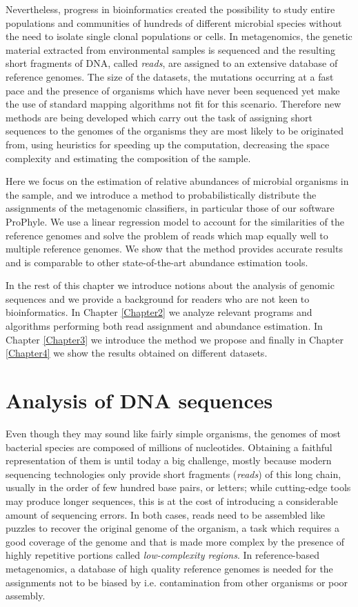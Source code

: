 Nevertheless, progress in bioinformatics created the possibility to study entire populations and communities of hundreds of different microbial species without the need to isolate single clonal populations or cells. In metagenomics, the genetic material extracted from environmental samples is sequenced and the resulting short fragments of DNA, called \textit{reads}, are assigned to an extensive database of reference genomes. The size of the datasets, the mutations occurring at a fast pace and the presence of organisms which have never been sequenced yet make the use of standard mapping algorithms not fit for this scenario. Therefore new methods are being developed which carry out the task of assigning short sequences to the genomes of the organisms they are most likely to be originated from, using heuristics for speeding up the computation, decreasing the space complexity and estimating the composition of the sample.

Here we focus on the estimation of relative abundances of microbial organisms in the sample, and we introduce a method to probabilistically distribute the assignments of the metagenomic classifiers, in particular those of our software ProPhyle. We use a linear regression model to account for the similarities of the reference genomes and solve the problem of reads which map equally well to multiple reference genomes. We show that the method provides accurate results and is comparable to other state-of-the-art abundance estimation tools.

In the rest of this chapter we introduce notions about the analysis of genomic sequences and we provide a background for readers who are not keen to bioinformatics. In Chapter \ref{Chapter2} we analyze relevant programs and algorithms performing both read assignment and abundance estimation. In Chapter \ref{Chapter3} we introduce the method we propose and finally in Chapter \ref{Chapter4} we show the results obtained on different datasets.

\section{Analysis of DNA sequences}

Even though they may sound like fairly simple organisms, the genomes of most bacterial species are composed of millions of nucleotides. Obtaining a faithful representation of them is until today a big challenge, mostly because modern sequencing technologies only provide short fragments (\textit{reads}) of this long chain, usually in the order of few hundred base pairs, or letters; while cutting-edge tools may produce longer sequences, this is at the cost of introducing a considerable amount of sequencing errors. In both cases, reads need to be assembled like puzzles to recover the original genome of the organism, a task which requires a good coverage of the genome and that is made more complex by the presence of highly repetitive portions called \textit{low-complexity regions}. In reference-based metagenomics, a database of high quality reference genomes is needed for the assignments not to be biased by i.e. contamination from other organisms or poor assembly.

